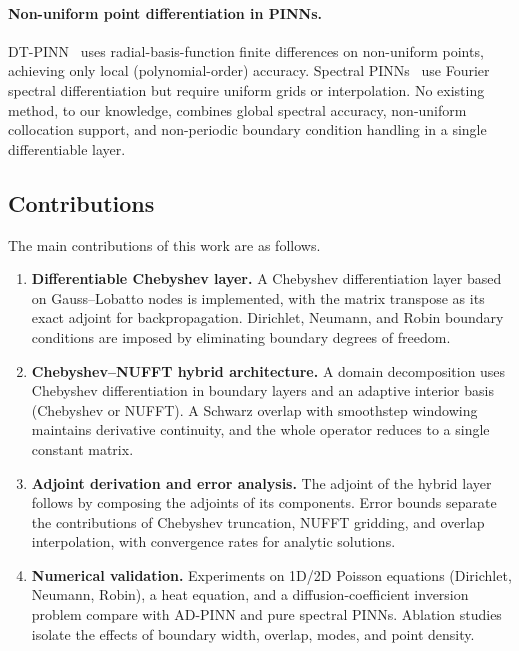 \documentclass[sn-mathphys,Numbered]{sn-jnl}
\theoremstyle{thmstyleone}
\theoremstyle{thmstyletwo}
\theoremstyle{thmstylethree}
\begin{document}
\paragraph{Non-uniform point differentiation in PINNs.}
DT-PINN~\cite{sharma2022dt} uses radial-basis-function finite differences on non-uniform points, achieving only local (polynomial-order) accuracy. Spectral PINNs~\cite{yu2024fourier} use Fourier spectral differentiation but require uniform grids or interpolation. No existing method, to our knowledge, combines global spectral accuracy, non-uniform collocation support, and non-periodic boundary condition handling in a single differentiable layer.

\subsection{Contributions}
The main contributions of this work are as follows.

\begin{enumerate}
    \item \textbf{Differentiable Chebyshev layer.} A Chebyshev differentiation layer based on Gauss--Lobatto nodes is implemented, with the matrix transpose as its exact adjoint for backpropagation. Dirichlet, Neumann, and Robin boundary conditions are imposed by eliminating boundary degrees of freedom.

    \item \textbf{Chebyshev--NUFFT hybrid architecture.} A domain decomposition uses Chebyshev differentiation in boundary layers and an adaptive interior basis (Chebyshev or NUFFT). A Schwarz overlap with smoothstep windowing maintains derivative continuity, and the whole operator reduces to a single constant matrix.

    \item \textbf{Adjoint derivation and error analysis.} The adjoint of the hybrid layer follows by composing the adjoints of its components. Error bounds separate the contributions of Chebyshev truncation, NUFFT gridding, and overlap interpolation, with convergence rates for analytic solutions.

    \item \textbf{Numerical validation.} Experiments on 1D/2D Poisson equations (Dirichlet, Neumann, Robin), a heat equation, and a diffusion-coefficient inversion problem compare with AD-PINN and pure spectral PINNs. Ablation studies isolate the effects of boundary width, overlap, modes, and point density.
\end{enumerate}
\end{document}
